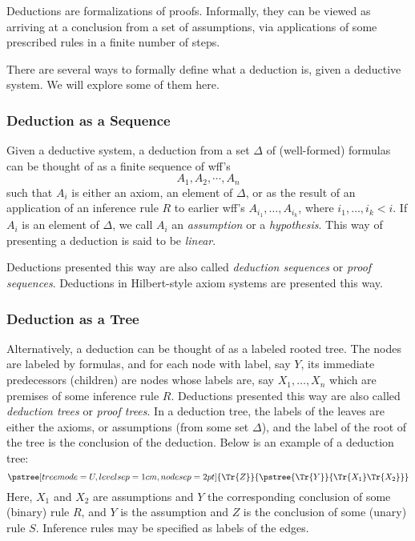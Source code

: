 \documentclass[12pt]{article}
\begin{document}
Deductions are formalizations of proofs.  Informally, they can be viewed as arriving at a conclusion from a set of assumptions, via applications of some prescribed rules in a finite number of steps.

There are several ways to formally define what a deduction is, given a deductive system.  We will explore some of them here.

\subsubsection*{Deduction as a Sequence}

Given a deductive system, a deduction from a set $\Delta$ of (well-formed) formulas can be thought of as a finite sequence of wff's $$A_1, A_2, \cdots, A_n$$
such that $A_i$ is either an axiom, an element of $\Delta$, or as the result of an application of an inference rule $R$ to earlier wff's $A_{i_1},\ldots, A_{i_k}$, where $i_1,\ldots,i_k < i$.  If $A_i$ is an element of $\Delta$, we call $A_i$ an \emph{assumption} or a \emph{hypothesis}.  This way of presenting a deduction is said to be \emph{linear}.  

Deductions presented this way are also called \emph{deduction sequences} or \emph{proof sequences}.  Deductions in Hilbert-style axiom systems are presented this way.

\subsubsection*{Deduction as a Tree}

Alternatively, a deduction can be thought of as a labeled rooted tree.  The nodes are labeled by formulas, and for each node with label, say $Y$, its immediate predecessors (children) are nodes whose labels are, say $X_1,\ldots, X_n$ which are premises of some inference rule $R$.  Deductions presented this way are also called \emph{deduction trees} or \emph{proof trees}.  In a deduction tree, the labels of the leaves are either the axioms, or assumptions (from some set $\Delta$), and the label of the root of the tree is the conclusion of the deduction.  Below is an example of a deduction tree:
$$
\pstree[treemode=U,levelsep=1cm,nodesep=2pt]
{\Tr{Z}}{
\pstree{\Tr{Y}}
{\Tr{X_1}\Tr{X_2}}
}
$$
Here, $X_1$ and $X_2$ are assumptions and $Y$ the corresponding conclusion of some (binary) rule $R$, and $Y$ is the assumption and $Z$ is the conclusion of some (unary) rule $S$.  Inference rules may be specified as labels of the edges.  
\end{document}
